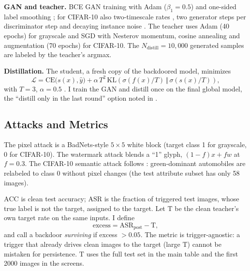\documentclass[conference]{IEEEtran}
\newcommand{\ASR}{\mathrm{ASR}}
\newcommand{\ACC}{\mathrm{ACC}}
\newcommand{\Texc}{\mathrm{T}}
\begin{document}
\textbf{GAN and teacher.} BCE GAN training with Adam \cite{kingma2015adam} ($\beta_1=0.5$) and one-sided label smoothing \cite{salimans2016improved}; for CIFAR-10 also two-timescale rates \cite{heusel2017ttur}, two generator steps per discriminator step and decaying instance noise \cite{sonderby2017amortised}. The teacher uses Adam (40 epochs) for grayscale and SGD with Nesterov momentum, cosine annealing \cite{loshchilov2017sgdr} and augmentation (70 epochs) for CIFAR-10. The $N_{\mathrm{distill}}=10{,}000$ generated samples are labeled by the teacher's argmax.

\textbf{Distillation.} The student, a fresh copy of the backdoored model, minimizes
\begin{equation}
\mathcal{L}=\mathrm{CE}\big(s(x),\hat y\big)+\alpha\,T^{2}\,\mathrm{KL}\!\left(\sigma(f(x)/T)\,\Vert\,\sigma(s(x)/T)\right),
\label{eq:loss}
\end{equation}
with $T=3$, $\alpha=0.5$ \cite{hinton2015kd}. I train the GAN and distill once on the final global model, the ``distill only in the last round'' option noted in \cite{zhu2023adfl}.

\subsection{Attacks and Metrics}
The pixel attack is a BadNets-style \cite{gu2017badnets} $5{\times}5$ white block (target class 1 for grayscale, 0 for CIFAR-10). The watermark attack blends a ``1'' glyph, $(1-f)x+fw$ at $f=0.3$. The CIFAR-10 semantic attack follows \cite{bagdasaryan2020backdoor}: green-dominant automobiles are relabeled to class 0 without pixel changes (the test attribute subset has only 58 images).

$\ACC$ is clean test accuracy; $\ASR$ is the fraction of triggered test images, whose true label is not the target, assigned to the target. Let $\Texc$ be the clean teacher's own target rate on the same inputs. I define
\begin{equation}
\mathrm{excess}=\ASR_{\mathrm{post}}-\Texc,
\label{eq:excess}
\end{equation}
and call a backdoor \emph{surviving} if excess $>0.05$. The metric is trigger-agnostic: a trigger that already drives clean images to the target (large $\Texc$) cannot be mistaken for persistence. $\Texc$ uses the full test set in the main table and the first 2000 images in the screens.
\end{document}
